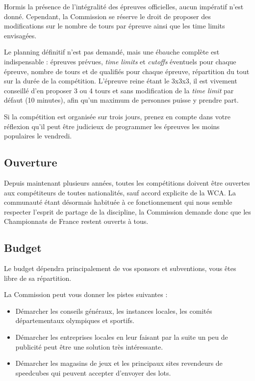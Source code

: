 \documentclass[a4paper,12pt]{scrartcl}
\begin{document}
Hormis la présence de l'intégralité des épreuves officielles, aucun impératif n'est donné. Cependant, la Commission se réserve le droit de proposer des modifications sur le nombre de tours par épreuve ainsi que les time limits envisagées.

Le planning définitif n'est pas demandé, mais une ébauche complète est indispensable : épreuves prévues, \emph{time limits} et \emph{cutoffs} éventuels pour chaque épreuve, nombre de tours et de qualifiés pour chaque épreuve, répartition du tout sur la durée de la compétition. L'épreuve reine étant le 3x3x3, il est vivement conseillé d'en proposer 3 ou 4 tours et sans modification de la \emph{time limit} par défaut (10 minutes), afin qu'un maximum de personnes puisse y prendre part.

Si la compétition est organisée sur trois jours, prenez en compte dans votre réflexion qu'il peut être judicieux de programmer les épreuves les moins populaires le vendredi.

\subsection*{Ouverture}
Depuis maintenant plusieurs années, toutes les compétitions doivent être ouvertes aux compétiteurs de toutes nationalités, sauf accord explicite de la WCA. La communauté étant désormais habituée à ce fonctionnement qui nous semble respecter l'esprit de partage de la discipline, la Commission demande donc que les Championnats de France restent ouverts à tous.


\subsection*{Budget}

Le budget dépendra principalement de vos sponsors et subventions, vous êtes libre de sa répartition.

La Commission peut vous donner les pistes suivantes :

\begin{itemize}
    \item Démarcher les conseils généraux, les instances locales, les comités départementaux olympiques et sportifs.
    \item Démarcher les entreprises locales en leur faisant par la suite un peu de publicité peut être une solution très intéressante.
    \item Démarcher les magasins de jeux et les principaux sites revendeurs de speedcubes qui peuvent accepter d'envoyer des lots.
\end{itemize}
\end{document}
